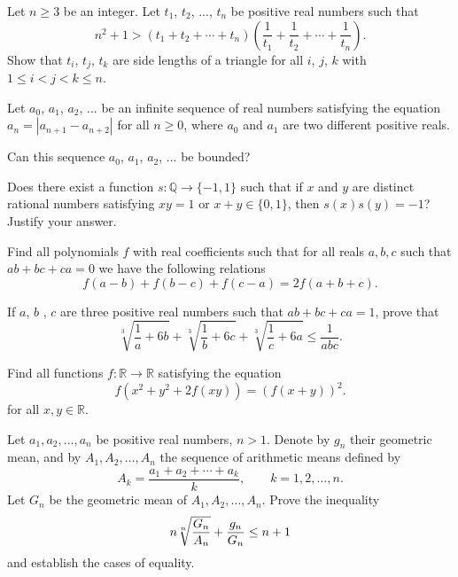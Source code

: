 \item[\textbf{A1.}]Let $n \geq 3$ be an integer. Let $t_1$,  $t_2$,  ..., $t_n$ be positive real numbers such that \[n^2 + 1 > \left( t_1 + t_2 + \cdots + t_n \right) \left( \frac{1}{t_1} + \frac{1}{t_2} + \cdots + \frac{1}{t_n} \right).\] Show that $t_i$,  $t_j$,  $t_k$ are side lengths of a triangle for all $i$,  $j$,  $k$ with $1 \leq i < j < k \leq n$.

\item[\textbf{A2.}]Let $a_0$,  $a_1$,  $a_2$,  ... be an infinite sequence of real numbers satisfying the equation $a_n=\left|a_{n+1}-a_{n+2}\right|$ for all $n\geq 0$,  where $a_0$ and $a_1$ are two different positive reals.

Can this sequence $a_0$,  $a_1$,  $a_2$,  ... be bounded?

\item[\textbf{A3.}]Does there exist a function $s\colon \mathbb{Q} \rightarrow \{-1,1\}$ such that if $x$ and $y$ are distinct rational numbers satisfying ${xy=1}$ or ${x+y\in \{0,1\}}$,  then ${s(x)s(y)=-1}$? Justify your answer.

\item[\textbf{A4.}]Find all polynomials $f$ with real coefficients such that for all reals $a,b,c$ such that $ab+bc+ca = 0$ we have the following relations\[ f(a-b) + f(b-c) + f(c-a) = 2f(a+b+c). \]

\item[\textbf{A5.}]If $a$,  $b$ , $c$ are three positive real numbers such that $ab+bc+ca = 1$,  prove that \[ \sqrt[3]{ \frac{1}{a} + 6b} + \sqrt[3]{\frac{1}{b} + 6c} + \sqrt[3]{\frac{1}{c} + 6a } \leq \frac{1}{abc}.  \]

\item[\textbf{A6.}]Find all functions $f:\mathbb{R} \to \mathbb{R}$ satisfying the equation \[
	f(x^2+y^2+2f(xy)) = (f(x+y))^2.
\] for all $x,y \in \mathbb{R}$.

\item[\textbf{A7.}]Let ${a_1,a_2,\dots,a_n}$ be positive real numbers, ${n>1}$. Denote by $g_n$ their geometric mean, and by $A_1,A_2,\dots,A_n$ the sequence of arithmetic means defined by \[ A_k=\frac{a_1+a_2+\cdots+a_k}{k},\qquad k=1,2,\dots,n. \]  Let $G_n$ be the geometric mean of $A_1,A_2,\dots,A_n$. Prove the inequality \[
n \root n\of{\frac{G_n}{A_n}}+ \frac{g_n}{G_n}\le n+1 \] and establish the cases of equality.

